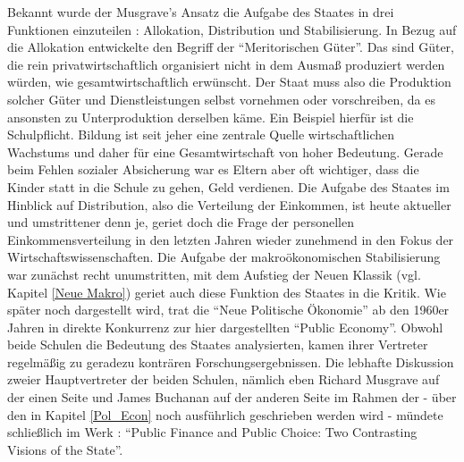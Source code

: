 Bekannt wurde der Musgrave's Ansatz die Aufgabe des Staates in drei Funktionen einzuteilen \parencite{Musgrave1956, Musgrave1959}: Allokation, Distribution und Stabilisierung. In Bezug auf die Allokation entwickelte \textcite{Musgrave1956} den Begriff der "`Meritorischen Güter"'. Das sind Güter, die rein privatwirtschaftlich organisiert nicht in dem Ausmaß produziert werden würden, wie gesamtwirtschaftlich erwünscht. Der Staat muss also die Produktion solcher Güter und Dienstleistungen selbst vornehmen oder vorschreiben, da es ansonsten zu Unterproduktion derselben käme. Ein Beispiel hierfür ist die Schulpflicht. Bildung ist seit jeher eine zentrale Quelle wirtschaftlichen Wachstums und daher für eine Gesamtwirtschaft von hoher Bedeutung. Gerade beim Fehlen sozialer Absicherung war es Eltern aber oft wichtiger, dass die Kinder statt in die Schule zu gehen, Geld verdienen. Die Aufgabe des Staates im Hinblick auf Distribution, also die Verteilung der Einkommen, ist heute aktueller und umstrittener denn je, geriet doch die Frage der personellen Einkommensverteilung in den letzten Jahren wieder zunehmend in den Fokus der Wirtschaftswissenschaften. Die Aufgabe der makroökonomischen Stabilisierung war zunächst recht unumstritten, mit dem Aufstieg der Neuen Klassik (vgl. Kapitel \ref{Neue Makro}) geriet auch diese Funktion des Staates in die Kritik. Wie später noch dargestellt wird, trat die "`Neue Politische Ökonomie"' ab den 1960er Jahren in direkte Konkurrenz zur hier dargestellten "`Public Economy"'. Obwohl beide Schulen die Bedeutung des Staates analysierten, kamen ihrer Vertreter regelmäßig zu geradezu konträren Forschungsergebnissen. Die lebhafte Diskussion zweier Hauptvertreter der beiden Schulen, nämlich eben Richard Musgrave auf der einen Seite und James Buchanan auf der anderen Seite im Rahmen der - über den in Kapitel \ref{Pol_Econ} noch ausführlich geschrieben werden wird - mündete schließlich im Werk \textcite{Musgrave1999}: "`Public Finance and Public Choice: Two Contrasting Visions of the State"'.


